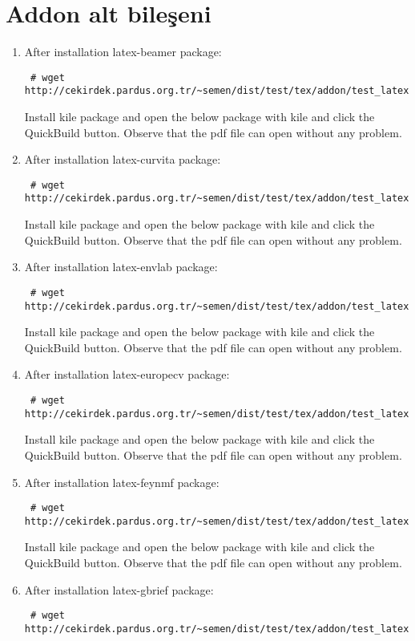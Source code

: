 \documentclass[a4paper,10pt]{article}
\begin{document}
\section{Addon alt bileşeni}
\begin{enumerate}
\item  After installation latex-beamer package:
\begin{verbatim}
 # wget http://cekirdek.pardus.org.tr/~semen/dist/test/tex/addon/test_latexbeamer.tex
\end{verbatim}

Install kile package and open the below package with kile and click the QuickBuild button. Observe that the pdf file can open without any problem.
\item After installation latex-curvita package:
\begin{verbatim}
 # wget http://cekirdek.pardus.org.tr/~semen/dist/test/tex/addon/test_latexcurrvita.tex
\end{verbatim}

Install kile package and open the below package with kile and click the QuickBuild button. Observe that the pdf file can open without any problem.
\item After installation latex-envlab package:
\begin{verbatim}
 # wget http://cekirdek.pardus.org.tr/~semen/dist/test/tex/addon/test_latexenvlab.tex
\end{verbatim}

Install kile package and open the below package with kile and click the QuickBuild button. Observe that the pdf file can open without any problem.
\item  After installation latex-europecv package:
\begin{verbatim}
 # wget http://cekirdek.pardus.org.tr/~semen/dist/test/tex/addon/test_latexeuropecv.tex
\end{verbatim}

Install kile package and open the below package with kile and click the QuickBuild button. Observe that the pdf file can open without any problem.
\item After installation latex-feynmf package:
\begin{verbatim}
 # wget http://cekirdek.pardus.org.tr/~semen/dist/test/tex/addon/test_latexfeynmf.tex
\end{verbatim}

Install kile package and open the below package with kile and click the QuickBuild button. Observe that the pdf file can open without any problem.
\item  After installation latex-gbrief package:
\begin{verbatim}
 # wget http://cekirdek.pardus.org.tr/~semen/dist/test/tex/addon/test_latexgbrief.tex
\end{verbatim}


\end{enumerate}
\end{document}
